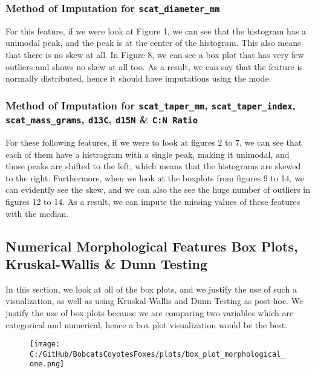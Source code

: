 \documentclass[a4paper]{article}
\begin{document}
\subsubsection{Method of Imputation for \texttt{scat\_diameter\_mm}}
For this feature, if we were look at Figure 1, we can see that the histogram has a unimodal peak, and the peak is at the center of the histogram. This also
means that there is no skew at all. In Figure 8, we can see a box plot that has very few outliers and shows no skew at all too. As a result, we can say that
the feature is normally distributed, hence it should have imputations using the mode.

\subsubsection{Method of Imputation for \texttt{scat\_taper\_mm}, \texttt{scat\_taper\_index}, \texttt{scat\_mass\_grams}, \texttt{d13C}, \texttt{d15N} \& 
\texttt{C:N Ratio}}
For these following features, if we were to look at figures 2 to 7, we can see that each of them have a histrogram with a single peak, making it unimodal,
and those peaks are shifted to the left, which means that the histograms are skewed to the right.  Furthermore, when we look at the boxplots from figures
9 to 14, we can evidently see the skew, and we can also the see the huge number of outliers in figures 12 to 14. As a result, we can impute the missing values
of these features with the median.

\newpage

\subsection{Numerical Morphological Features Box Plots, Kruskal-Wallis \& Dunn Testing}
In this section, we look at all of the box plots, and we justify the use of such a visualization, as well as using Kruskal-Wallis and Dunn Testing as post-hoc.
We justify the use of box plots because we are comparing two variables which are categorical and numerical, hence a box plot  visualization would be the best.
\vspace{0.5cm}
\begin{figure}[h]
    \centering
    \texttt{[image: C:/GitHub/BobcatsCoyotesFoxes/plots/box\_plot\_morphological\_one.png]} 
\end{figure}

\newpage
\end{document}
